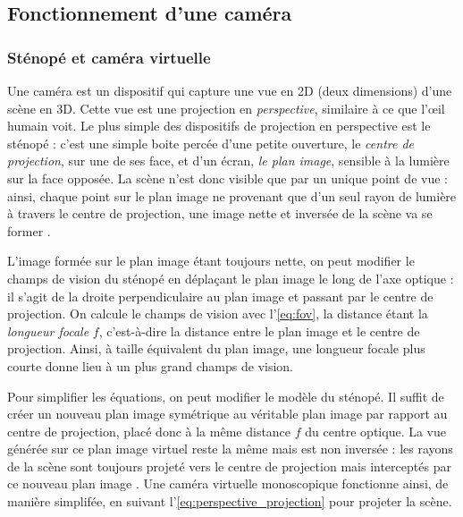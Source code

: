 \subsection{Fonctionnement d'une caméra}
\subsubsection{Sténopé et caméra virtuelle}
Une caméra est un dispositif qui capture une vue en 2D (deux dimensions) d'une scène en 3D. Cette vue est une projection en \emph{perspective}, similaire à ce que l'\oe il humain voit. Le plus simple des dispositifs de projection en perspective est le sténopé : c'est une simple boite percée d'une petite ouverture, le \emph{centre de projection}, sur une de ses face, et d'un écran, \emph{le plan image}, sensible à la lumière sur la face opposée. La scène n'est donc visible que par un unique point de vue : ainsi, chaque point sur le plan image ne provenant que d'un seul rayon de lumière à travers le centre de projection, une image nette et inversée de la scène va se former .


L'image formée sur le plan image étant toujours nette, on peut modifier le champs de vision du sténopé en déplaçant le plan image le long de l'axe optique : il s'agit de la droite perpendiculaire au plan image et passant par le centre de projection. On calcule le champs de vision avec l'\autoref{eq:fov}, la distance étant la \emph{longueur focale} $f$, c'est-à-dire la distance entre le plan image et le centre de projection. Ainsi, à taille équivalent du plan image, une longueur focale plus courte donne lieu à un plus grand champs de vision.

Pour simplifier les équations, on peut modifier le modèle du sténopé. Il suffit de créer un nouveau plan image symétrique au véritable plan image par rapport au centre de projection, placé donc à la même distance $f$ du centre optique. La vue générée sur ce plan image virtuel reste la même mais est non inversée : les rayons de la scène sont toujours projeté vers le centre de projection mais interceptés par ce nouveau plan image . Une caméra virtuelle monoscopique fonctionne ainsi, de manière simplifée, en suivant l'\autoref{eq:perspective_projection} pour projeter la scène.


